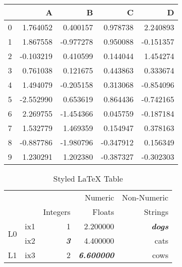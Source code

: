 \documentclass[10pt, oneside]{article}
\begin{document}
        \begin{tabular}{lrrrr}
            \toprule
            {} &         A &         B &         C &         D \\
            \midrule
            0 &  1.764052 &  0.400157 &  0.978738 &  2.240893 \\
            1 &  1.867558 & -0.977278 &  0.950088 & -0.151357 \\
            2 & -0.103219 &  0.410599 &  0.144044 &  1.454274 \\
            3 &  0.761038 &  0.121675 &  0.443863 &  0.333674 \\
            4 &  1.494079 & -0.205158 &  0.313068 & -0.854096 \\
            5 & -2.552990 &  0.653619 &  0.864436 & -0.742165 \\
            6 &  2.269755 & -1.454366 &  0.045759 & -0.187184 \\
            7 &  1.532779 &  1.469359 &  0.154947 &  0.378163 \\
            8 & -0.887786 & -1.980796 & -0.347912 &  0.156349 \\
            9 &  1.230291 &  1.202380 & -0.387327 & -0.302303 \\
            \bottomrule
            \end{tabular}
        
        


    \begin{table}[h]
        \centering
        \caption{Styled LaTeX Table}
        \label{table:5}
        \begin{tabular}{rrrrr}
        \toprule
        {} & {} & \multicolumn{2}{r}{Numeric} & {Non-Numeric} \\
        {} & {} & {Integers} & {Floats} & {Strings} \\
        \midrule
        \multirow[t]{2}{*}{L0} & ix1 & 1 & 2.200000 & \cellcolor[HTML]{FFFF00} \color{red} \itshape \bfseries dogs \\
         & ix2 & \cellcolor[HTML]{FFFF00} \color{red} \itshape \bfseries 3 & 4.400000 & cats \\
        L1 & ix3 & 2 & \cellcolor[HTML]{FFFF00} \color{red} \itshape \bfseries 6.600000 & cows \\
        \bottomrule
        \end{tabular}
        \end{table}
\end{document}

